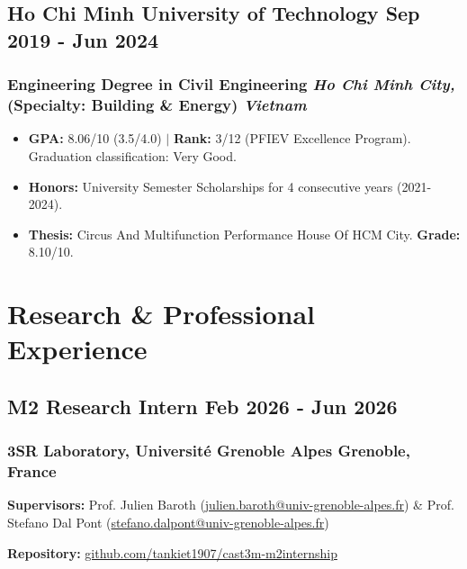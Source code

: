 \documentclass[11pt]{article} %
\begin{document}
\vspace{0.15cm}

\subsection{Ho Chi Minh University of Technology \hfill Sep 2019 - Jun 2024}
\subsubsection{Engineering Degree in Civil Engineering \hfill \normalfont\textit{Ho Chi Minh City,} \\
\normalfont (Specialty: Building \& Energy) \hfill \normalfont\textit{Vietnam}}
\begin{itemize}
    \item \textbf{GPA:} 8.06/10 (3.5/4.0) $|$ \textbf{Rank:} 3/12 (PFIEV Excellence Program). Graduation classification: Very Good.
    \item \textbf{Honors:} University Semester Scholarships for 4 consecutive years (2021-2024).
    \item \textbf{Thesis:} Circus And Multifunction Performance House Of HCM City. \textbf{Grade:} 8.10/10.
\end{itemize}

\section{Research \& Professional Experience}
\subsection{M2 Research Intern \hfill Feb 2026 - Jun 2026}
\subsubsection{3SR Laboratory, Université Grenoble Alpes \hfill Grenoble, France}
\vspace{0.2em}

\noindent \textbf{Supervisors:} 
Prof. Julien Baroth (\href{mailto:julien.baroth@univ-grenoble-alpes.fr}{julien.baroth@univ-grenoble-alpes.fr}) \& 
Prof. Stefano Dal Pont (\href{mailto:stefano.dalpont@univ-grenoble-alpes.fr}{stefano.dalpont@univ-grenoble-alpes.fr}) 

\noindent \textbf{Repository:} \href{https://github.com/tankiet1907/cast3m-m2internship}{github.com/tankiet1907/cast3m-m2internship}
\vspace{0.2em}
\end{document}
